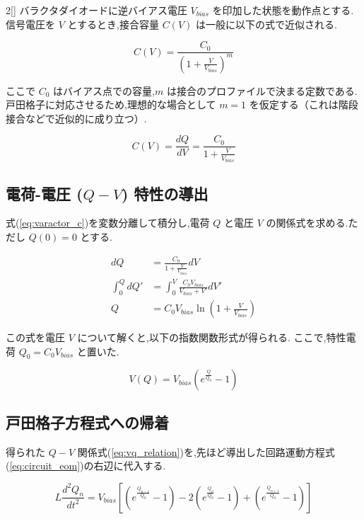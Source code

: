 \documentclass[a4paper,10pt]{article}
\begin{document}
\begin{multicols}{2}[\raggedcolumns]
バラクタダイオードに逆バイアス電圧 $V_{bias}$ を印加した状態を動作点とする.信号電圧を $V$ とするとき,接合容量 $C(V)$ は一般に以下の式で近似される.

\begin{equation}
    C(V) = \frac{C_0}{(1 + \frac{V}{V_{bias}})^m}
\end{equation}

ここで $C_0$ はバイアス点での容量,$m$ は接合のプロファイルで決まる定数である.
戸田格子に対応させるため,理想的な場合として $m=1$ を仮定する（これは階段接合などで近似的に成り立つ）.

\begin{equation}
    C(V) = \frac{dQ}{dV} = \frac{C_0}{1 + \frac{V}{V_{bias}}} \label{eq:varactor_c}
\end{equation}

\subsection{電荷-電圧 ($Q-V$) 特性の導出}

式(\ref{eq:varactor_c})を変数分離して積分し,電荷 $Q$ と電圧 $V$ の関係式を求める.ただし $Q(0)=0$ とする.

\begin{align}
    dQ &= \frac{C_0}{1 + \frac{V}{V_{bias}}} dV \\
    \int_0^Q dQ' &= \int_0^V \frac{C_0 V_{bias}}{V_{bias} + V'} dV' \\
    Q &= C_0 V_{bias} \ln \left( 1 + \frac{V}{V_{bias}} \right)
\end{align}

この式を電圧 $V$ について解くと,以下の指数関数形式が得られる.
ここで,特性電荷 $Q_0 = C_0 V_{bias}$ と置いた.

\begin{equation}
    V(Q) = V_{bias} \left( e^{\frac{Q}{Q_0}} - 1 \right) \label{eq:vq_relation}
\end{equation}

\subsection{戸田格子方程式への帰着}

得られた $Q-V$ 関係式(\ref{eq:vq_relation})を,先ほど導出した回路運動方程式(\ref{eq:circuit_eom})の右辺に代入する.

\begin{equation}
    L \frac{d^2 Q_n}{dt^2} = V_{bias} \left[ \left( e^{\frac{Q_{n-1}}{Q_0}} - 1 \right) - 2\left( e^{\frac{Q_n}{Q_0}} - 1 \right) + \left( e^{\frac{Q_{n+1}}{Q_0}} - 1 \right) \right]
\end{equation}


\end{multicols}
\end{document}
